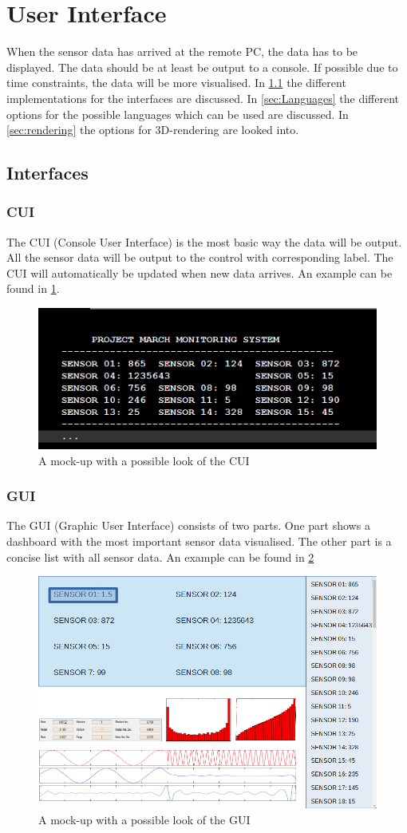 \section{User Interface}\label{sec:ui}
When the sensor data has arrived at the remote PC, the data has to be displayed. The data should be at least be output to a console. If possible due to time constraints, the data will be more visualised. In \ref{sec: Interfaces} the different implementations for the interfaces are discussed. In \ref{sec:Languages} the different options for the possible languages which can be used are discussed. In \ref{sec:rendering} the options for 3D-rendering are looked into.
\subsection{Interfaces}\label{sec: Interfaces}
\subsubsection{CUI}
The CUI (Console User Interface) is the most basic way the data will be output. All the sensor data will be output to the control with corresponding label. The CUI will automatically be updated when new data arrives. An example can be found in \ref{fig:CUI}.
\begin{figure}[H]
	\centering
	\includegraphics[width=.75\textwidth]{MockupCUI}
	\caption{A mock-up with a possible look of the CUI} 
	\label{fig:CUI}
\end{figure} 
\subsubsection{GUI}
The GUI (Graphic User Interface) consists of two parts. One part shows a dashboard with the most important sensor data visualised. The other part is a concise list with all sensor data. An example can be found in \ref{fig:GUI}  
\begin{figure}[H]
	\centering
	\includegraphics[width=.75\textwidth]{MockupGUI}
	\caption{A mock-up with a possible look of the GUI} 
	\label{fig:GUI}
\end{figure} 
